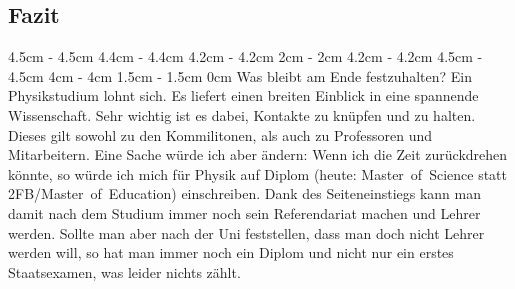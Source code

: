 \begin{multicols*}{2}
\subsection*{\hspace{4.5cm}Fazit}
4.5cm \dimexpr\columnwidth - 4.5cm
4.4cm \dimexpr\columnwidth - 4.4cm
4.2cm \dimexpr\columnwidth - 4.2cm
2cm \dimexpr\columnwidth - 2cm
4.2cm \dimexpr\columnwidth - 4.2cm
4.5cm \dimexpr\columnwidth - 4.5cm
4cm \dimexpr\columnwidth - 4cm
1.5cm \dimexpr\columnwidth - 1.5cm
0cm \columnwidth
Was bleibt am Ende festzuhalten? Ein Physikstudium lohnt sich. Es liefert einen breiten Einblick in eine spannende Wissenschaft. Sehr wichtig ist es dabei, Kontakte zu knüpfen und zu halten. Dieses gilt sowohl zu den Kommilitonen, als auch zu Professoren und Mitarbeitern. Eine Sache würde ich aber ändern: Wenn ich die Zeit zurückdrehen könnte, so würde ich mich für Physik auf Diplom (heute: Master~of~Science statt 2FB/Master~of~Education) einschreiben. Dank des Seiteneinstiegs kann man damit nach dem Studium immer noch sein Referendariat machen und Lehrer werden. Sollte man aber nach der Uni feststellen, dass man doch nicht Lehrer werden will, so hat man immer noch ein Diplom und nicht nur ein erstes Staatsexamen, was leider nichts zählt.

\begin{center}
\Large{}
\end{center}

\end{multicols*}
